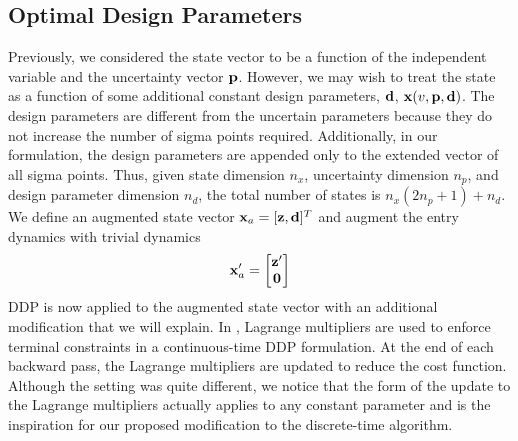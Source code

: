  
\subsection{Optimal Design Parameters}\label{Sec:DesignOptimization}
Previously, we considered the state vector to be a function of the independent variable and the uncertainty vector $\mathbf{p}$. However, we may wish to treat the state as a function of some additional constant design parameters, $\mathbf{d}$, $\mathbf{x}(v, \mathbf{p}, \mathbf{d})$. The design parameters are different from the uncertain parameters because they do not increase the number of sigma points required. Additionally, in our formulation, the design parameters are appended only to the extended vector of all sigma points. Thus, given state dimension $n_x$, uncertainty dimension $n_p$, and design parameter dimension $n_d$, the total number of states is $n_x(2n_p+1) + n_d$. We define an augmented state vector $\mathbf{x}_a = [\mathbf{z}, \mathbf{d}]^T$ 
and augment the entry dynamics with trivial dynamics
\begin{align}
	\mathbf{x}_a' = \left[
	\begin{matrix}
		\mathbf{z}' \\
		\mathbf{0}
	\end{matrix}
	\right]
\end{align}
DDP is now applied to the augmented state vector with an additional modification that we will explain. In \cite{DDP:ContinuousTerminalConstraints}, Lagrange multipliers are used to enforce terminal constraints in a continuous-time DDP formulation. At the end of each backward pass, the Lagrange multipliers are updated to reduce the cost function. Although the setting was quite different, we notice that the form of the update to the Lagrange multipliers actually applies to any constant parameter and is the inspiration for our proposed modification to the discrete-time algorithm.

